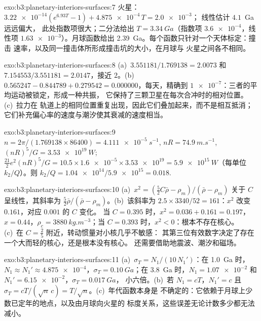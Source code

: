 \begin{solution}{exo:b3:planetary-interiors-surfaces:7}
火星：$\num{3.22e-14}(e^{6.93T} - 1) + \num{4.875e-4}\,T = \num{2.0e-3}$；
线性估计 $4.1$~Ga 远远偏大，
此处指数项很大；二分法给出 $T = \qty{3.34}{Ga}$（指数项
$\num{3.6e-4}$，线性项 $\num{1.63e-3}$）。月球函数给出
\qty{2.39}{Ga}。每个函数只针对一个天体标定：撞击
速率，以及同一撞击体所形成撞击坑的大小，在月球与
火星之间各不相同。
\end{solution}

\begin{solution}{exo:b3:planetary-interiors-surfaces:8}
(a)~$3.551181/1.769138 = 2.0073$ 和 $7.154553/3.551181 = 2.0147$，接近
$2$。(b)~$0.565247 - 0.844789 + 0.279542 = 0.000000$，每天，精确到
$\num{1e-7}$：三者的平均运动被锁定，形成一种共振，
它保持了三颗卫星在每次合冲时的相对位置。(c)~拉力在
轨道上的相同位置重复出现，因此它们叠加起来，而不是相互抵消；
它们补充偏心率的速度与潮汐使其衰减的速度相当。
\end{solution}

\begin{solution}{exo:b3:planetary-interiors-surfaces:9}
$n = 2\pi/(1.769138\times86400) = \qty{4.111e-5}{s^{-1}}$, $nR =
\qty{74.9}{m.s^{-1}}$, $(nR)^5/G = \qty{3.53e19}{W}$;
$\tfrac{21}{2}e^2(nR)^5/G = 10.5\times\num{1.6e-5}\times\num{3.53e19} =
\qty{5.9e15}{W}$（每单位 $k_2/Q$）。则 $k_2/Q =
\num{1.04e14}/\num{5.9e15} = 0.018$.
\end{solution}

\begin{solution}{exo:b3:planetary-interiors-surfaces:10}
(a)~$x^2 = (\tfrac52C\bar\rho - \rho_m)/(\bar\rho - \rho_m)$ 关于
$C$ 呈线性，其斜率为 $\tfrac52\bar\rho/(\bar\rho - \rho_m)$。(b)~该斜率为
$2.5\times3340/52 = 161$：$x^2$ 改变 $0.161$，对应 $0.001$ 的 $C$ 变化。
当 $C = 0.395$ 时，$x^2 = 0.036 + 0.161 = 0.197$，$x = 0.44$，$\rho_c =
\qty{3880}{kg.m^{-3}}$；当 $C = 0.393$ 时，$x^2 < 0$：根本不存在核心。
(c)~在 $C = \tfrac25$ 附近，转动惯量对小核几乎不敏感：
其第三位有效数字决定了存在一个大而轻的核心，还是根本没有核心。
还需要借助地震波、潮汐和磁场。
\end{solution}

\begin{solution}{exo:b3:planetary-interiors-surfaces:11}
(a)~$\sigma_T = N_1/(10\,N_1')$：在 \qty{1.0}{Ga} 时，$N_1 \approx N_1' \approx
\num{4.875e-4}$，$\sigma_T = \qty{0.10}{Ga}$；在 \qty{3.8}{Ga} 时，$N_1 =
\num{1.07e-2}$ 和 $N_1' = \num{6.15e-2}$，$\sigma_T = \qty{0.017}{Ga}$，
小六倍。(b)~若 $N_1 = cT$，$N_1' = c$ 且 $\sigma_T =
cT/(\sqrt n\,c) = T/\sqrt n$。(c)~年代函数本身是
不确定的：它依赖于月球上少数已定年的地点，以及由月球向火星的
标度关系，这些误差无论计数多少都无法减小。
\end{solution}

